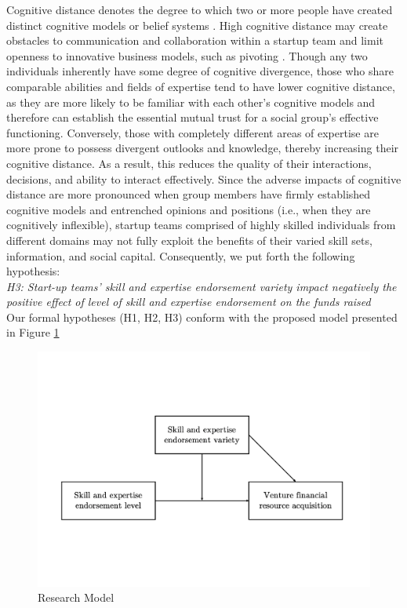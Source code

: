\documentclass[12pt]{article}
\begin{document}
Cognitive distance denotes the degree to which two or more people have created distinct cognitive models or belief systems \citep{nooteboom2007optimal}. High cognitive distance may create obstacles to communication and collaboration within a startup team and limit openness to innovative business models, such as pivoting \citep{kirtley2020pivot}. Though any two individuals inherently have some degree of cognitive divergence, those who share comparable abilities and fields of expertise tend to have lower cognitive distance, as they are more likely to be familiar with each other's cognitive models and therefore can establish the essential mutual trust for a social group's effective functioning. Conversely, those with completely different areas of expertise are more prone to possess divergent outlooks and knowledge, thereby increasing their cognitive distance. As a result, this reduces the quality of their interactions, decisions, and ability to interact effectively. Since the adverse impacts of cognitive distance are more pronounced when group members have firmly established cognitive models and entrenched opinions and positions (i.e., when they are cognitively inflexible), startup teams comprised of highly skilled individuals from different domains may not fully exploit the benefits of their varied skill sets, information, and social capital. Consequently, we put forth the following hypothesis: \\

\noindent \textit{H3: Start-up teams' skill and expertise endorsement variety impact negatively the positive effect of level of skill and expertise endorsement on the funds raised} \\

Our formal hypotheses (H1, H2, H3) conform with the proposed model presented in Figure \ref{Figure1}

\begin{figure}[!b]
  \includegraphics[width=\linewidth, scale=0.5]{model.pdf}
  \caption{Research Model}
  \label{Figure1}
\end{figure}
\end{document}
